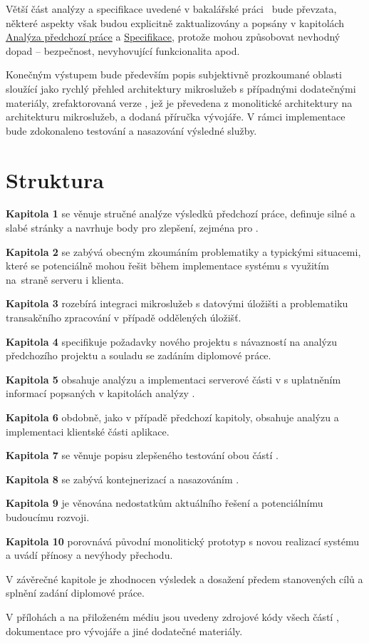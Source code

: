 Větší část analýzy a specifikace uvedené v bakalářské práci~\cite{bachelorthesis} bude převzata, některé aspekty však budou explicitně zaktualizovány a popsány v kapitolách \hyperref[ch:analysis]{Analýza předchozí práce} a \hyperref[ch:specification]{Specifikace}, protože mohou způsobovat nevhodný dopad – bezpečnost, nevyhovující funkcionalita apod.

Konečným výstupem bude především popis subjektivně prozkoumané oblasti  sloužící jako rychlý přehled architektury mikroslužeb s případnými dodatečnými materiály, zrefaktorovaná verze , jež je převedena z monolitické architektury na architekturu mikroslužeb, a dodaná příručka vývojáře.
V rámci implementace bude zdokonaleno testování a nasazování výsledné služby.


\newpage



\section{Struktura}\label{sec:struktura}

\textbf{Kapitola 1} se věnuje stručné analýze výsledků předchozí práce, definuje silné a slabé stránky a navrhuje body pro zlepšení, zejména pro .

\textbf{Kapitola 2} se zabývá obecným zkoumáním problematiky  a typickými situacemi, které se potenciálně mohou řešit během implementace systému s využitím \\na~straně serveru i klienta.

\textbf{Kapitola 3} rozebírá integraci mikroslužeb s datovými úložišti a problematiku transakčního zpracování v případě oddělených úložišť.

\textbf{Kapitola 4} specifikuje požadavky nového projektu s návazností na analýzu předchozího projektu a souladu se zadáním diplomové práce.

\textbf{Kapitola 5} obsahuje analýzu a implementaci serverové části  v  s uplatněním informací popsaných v kapitolách analýzy .

\textbf{Kapitola 6} obdobně, jako v případě předchozí kapitoly, obsahuje analýzu a implementaci klientské části aplikace.

\textbf{Kapitola 7} se věnuje popisu zlepšeného testování obou částí .

\textbf{Kapitola 8} se zabývá kontejnerizací a nasazováním .

\textbf{Kapitola 9} je věnována nedostatkům aktuálního řešení a potenciálnímu budoucímu rozvoji.

\textbf{Kapitola 10} porovnává původní monolitický prototyp s novou realizací systému a uvádí přínosy a nevýhody přechodu.

V závěrečné kapitole je zhodnocen výsledek a dosažení předem stanovených cílů a splnění zadání diplomové práce.

V přílohách a na přiloženém médiu jsou uvedeny zdrojové kódy všech částí , dokumentace pro vývojáře a jiné dodatečné materiály.
